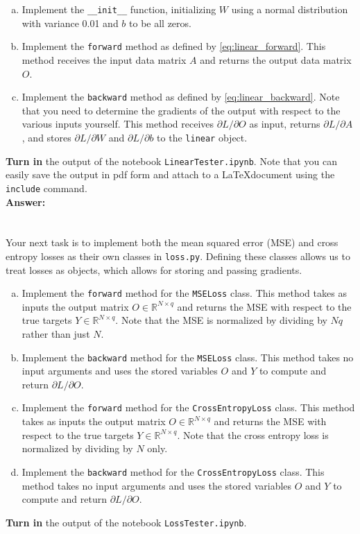 \documentclass{article}[12pt]
\newcommand{\bR}{\mathbb{R}}
\newcommand{\dLdO}{{\partial L / \partial O}}
\begin{document}
\begin{enumerate}[(a)]
    \item Implement the \texttt{\_\_init\_\_} function, initializing $W$ using a normal distribution with variance 0.01 and $b$ to be all zeros.
    \item Implement the \texttt{forward} method as defined by \eqref{eq:linear_forward}. This method receives the input data matrix $A$ and returns the output data matrix $O$.
    \item Implement the \texttt{backward} method as defined by \eqref{eq:linear_backward}. Note that you need to determine the gradients of the output with respect to the various inputs yourself. This method receives $\dLdO$ as input, returns $\partial L / \partial A$, and stores $\partial L / \partial W$ and $\partial L / \partial b$ to the \texttt{linear} object.
\end{enumerate}
\textbf{Turn in} the output of the notebook \texttt{LinearTester.ipynb}. Note that you can easily save the output in pdf form and attach to a \LaTeX document using the \texttt{include} command.\\

\textbf{Answer:}\\



\clearpage
\section{}

Your next task is to implement both the mean squared error (MSE) and cross entropy losses as their own classes in \texttt{loss.py}. Defining these classes allows us to treat losses as objects, which allows for storing and passing gradients.

\begin{enumerate}[(a)]
    \item Implement the \texttt{forward} method for the \texttt{MSELoss} class. This method takes as inputs the output matrix $O \in \bR^{N \times q}$ and returns the MSE with respect to the true targets $Y \in \bR^{N \times q}$. Note that the MSE is normalized by dividing by $Nq$ rather than just $N$.
    \item Implement the \texttt{backward} method for the \texttt{MSELoss} class. This method takes no input arguments and uses the stored variables $O$ and $Y$ to compute and return $\dLdO$.
    \item Implement the \texttt{forward} method for the \texttt{CrossEntropyLoss} class. This method takes as inputs the output matrix $O \in \bR^{N \times q}$ and returns the MSE with respect to the true targets $Y \in \bR^{N \times q}$. Note that the cross entropy loss is normalized by dividing by $N$ only.
    \item Implement the \texttt{backward} method for the \texttt{CrossEntropyLoss} class. This method takes no input arguments and uses the stored variables $O$ and $Y$ to compute and return $\dLdO$.
\end{enumerate}
\textbf{Turn in} the output of the notebook \texttt{LossTester.ipynb}.\\
\end{document}
